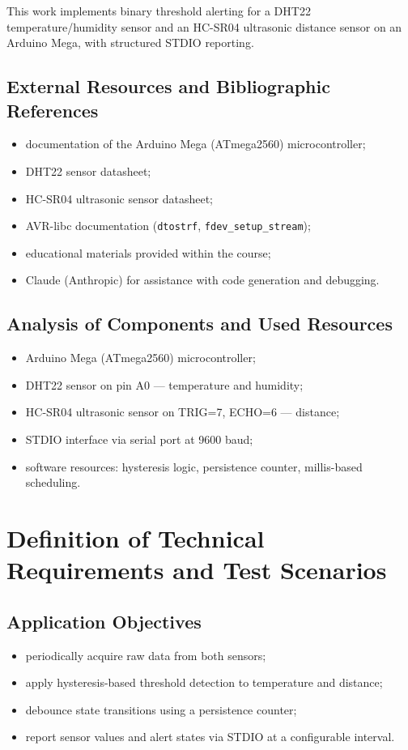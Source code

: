 \documentclass[12pt,a4paper]{article}
\begin{document}
This work implements binary threshold alerting for a DHT22 temperature/humidity sensor
and an HC-SR04 ultrasonic distance sensor on an Arduino Mega, with structured STDIO reporting.

\subsection{External Resources and Bibliographic References}
\begin{itemize}
    \item documentation of the Arduino Mega (ATmega2560) microcontroller;
    \item DHT22 sensor datasheet;
    \item HC-SR04 ultrasonic sensor datasheet;
    \item AVR-libc documentation (\texttt{dtostrf}, \texttt{fdev\_setup\_stream});
    \item educational materials provided within the course;
    \item Claude (Anthropic) for assistance with code generation and debugging.
\end{itemize}

\subsection{Analysis of Components and Used Resources}
\begin{itemize}
    \item Arduino Mega (ATmega2560) microcontroller;
    \item DHT22 sensor on pin A0 — temperature and humidity;
    \item HC-SR04 ultrasonic sensor on TRIG=7, ECHO=6 — distance;
    \item STDIO interface via serial port at 9600 baud;
    \item software resources: hysteresis logic, persistence counter, millis-based scheduling.
\end{itemize}

\section{Definition of Technical Requirements and Test Scenarios}

\subsection{Application Objectives}
\begin{itemize}
    \item periodically acquire raw data from both sensors;
    \item apply hysteresis-based threshold detection to temperature and distance;
    \item debounce state transitions using a persistence counter;
    \item report sensor values and alert states via STDIO at a configurable interval.
\end{itemize}
\end{document}
